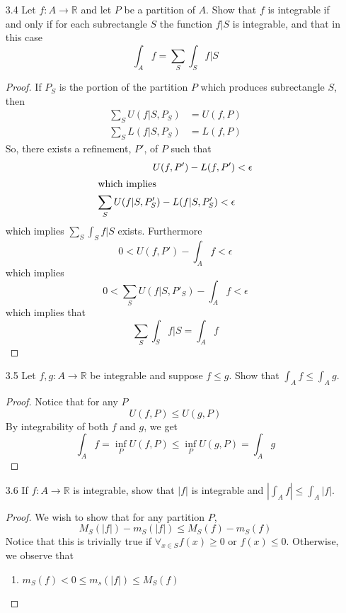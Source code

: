\begin{enumerate}
    \item[3.4] Let \( f:A \rightarrow \mathbb{R} \) and let \( P \) be a partition of \( A \). Show that \( f \) is integrable if and only if for each subrectangle \( S \) the function \( f \vert S \) is integrable, and that in this case
    \[
    \int_A f = \sum_S \int_S f \vert S
    \]
    \begin{proof}
    If \( P_S \) is the portion of the partition \( P \) which produces subrectangle \( S \), then
    \begin{align*}
        \sum_S U(f \vert S, P_S) &= U(f,P) \\
        \sum_S L(f \vert S, P_S) &= L(f,P)
    \end{align*}
    So, there exists a refinement, \( P' \), of \( P \) such that
    \begin{align*}
        U(f,P') - L(f, P') &< \epsilon \\
        \intertext{which implies}
        \sum_S U(f \vert S, P'_S) - L(f \vert S, P'_S) < \epsilon
    \end{align*}
    which implies \( \sum_S \int_S f \vert S \) exists. Furthermore
    \[
    0 < U(f,P') - \int_A f < \epsilon
    \]
    which implies
    \[
    0 < \sum_S U(f \vert S, P'_S) - \int_A f < \epsilon
    \]
    which implies that
    \[
    \sum_S \int_S f \vert S = \int_A f
    \]
    \end{proof}
    
    \item[3.5] Let \( f,g:A \rightarrow \mathbb{R} \) be integrable and suppose \( f \leq g \). Show that \( \int_A f \leq \int_A g \).
    \begin{proof}
    Notice that for any \( P \)
    \[
    U(f,P) \leq U(g,P)
    \]
    By integrability of both \( f \) and \( g \), we get
    \[
    \int_A f = \inf_P U(f,P) \leq \inf_P U(g,P) = \int_A g
    \]
    \end{proof}
    
    \item[3.6] If \( f:A \rightarrow \mathbb{R} \) is integrable, show that \( \left|  f \right| \) is integrable and \( \left| \int_A f \right| \leq \int_A \left| f \right| \).
    \begin{proof}
    We wish to show that for any partition \( P \),
    \[
    M_S(\left| f \right|) - m_S(\left| f \right|) \leq M_S(f) - m_S(f)
    \]
    Notice that this is trivially true if \( \forall_{x \in S} f(x) \geq 0 \) or \( f(x) \leq 0 \). Otherwise, we observe that
    \begin{enumerate}
        \item \( m_S(f) < 0 \leq m_s(\left| f \right|) \leq M_S(f) \)
    

\end{enumerate}
\end{proof}
\end{enumerate}
